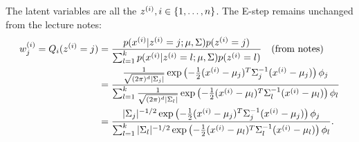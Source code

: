 \begin{answer}
The latent variables are all the $z^{(i)}, i \in \{1,\ldots,{n}\}$. The E-step remains unchanged from the lecture notes:
\begin{align*}
w^{(i)}_j= Q_i(z^{(i)}=j)
&= \frac{ p(x^{(i)}|z^{(i)}=j;\mu,\Sigma)p(z^{(i)}=j) }
        { \sum_{l=1}^k p(x^{(i)}|z^{(i)}=l;\mu,\Sigma)p(z^{(i)}=l) } \quad \text{(from notes)} \\
&= \frac{ \frac{1}{\sqrt{(2\pi)^{d}|\Sigma_j|}}\exp\left(-\frac{1}{2}(x^{(i)}-\mu_j)^T\Sigma_j^{-1}(x^{(i)}-\mu_j) \right)\phi_j }
        { \sum_{l=1}^k \frac{1}{\sqrt{(2\pi)^{d}|\Sigma_l|}}\exp\left(-\frac{1}{2}(x^{(i)}-\mu_l)^T\Sigma_l^{-1}(x^{(i)}-\mu_l) \right)\phi_l } \\
&= \frac{ |\Sigma_j|^{-1/2}\exp\left(-\frac{1}{2}(x^{(i)}-\mu_j)^T\Sigma_j^{-1}(x^{(i)}-\mu_j) \right)\phi_j }
        { \sum_{l=1}^k |\Sigma_l|^{-1/2}\exp\left(-\frac{1}{2}(x^{(i)}-\mu_l)^T\Sigma_l^{-1}(x^{(i)}-\mu_l) \right)\phi_l }.
\end{align*}
\end{answer}
